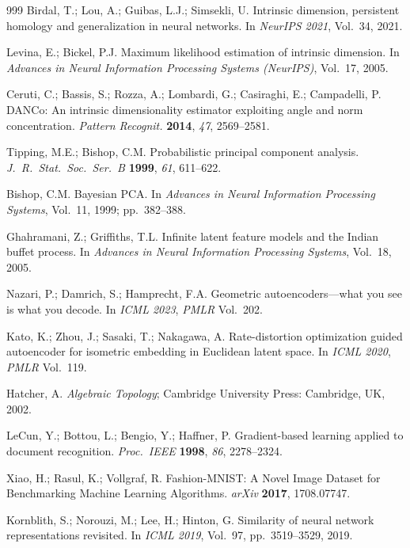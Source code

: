 \documentclass[make,article,submit,pdftex,moreauthors]{Definitions/mdpi}
\begin{document}
\begin{thebibliography}{999}
Birdal, T.; Lou, A.; Guibas, L.J.; Simsekli, U.
Intrinsic dimension, persistent homology and generalization in neural
networks.
In \textit{NeurIPS 2021}, Vol.~34, 2021.

Levina, E.; Bickel, P.J.
Maximum likelihood estimation of intrinsic dimension.
In \textit{Advances in Neural Information Processing Systems (NeurIPS)},
Vol.~17, 2005.

Ceruti, C.; Bassis, S.; Rozza, A.; Lombardi, G.; Casiraghi, E.;
Campadelli, P.
DANCo: An intrinsic dimensionality estimator exploiting angle and norm
concentration.
\textit{Pattern Recognit.} \textbf{2014}, \textit{47}, 2569--2581.

Tipping, M.E.; Bishop, C.M.
Probabilistic principal component analysis.
\textit{J.\ R.\ Stat.\ Soc.\ Ser.\ B} \textbf{1999}, \textit{61}, 611--622.

Bishop, C.M.
Bayesian PCA.
In \textit{Advances in Neural Information Processing Systems}, Vol.~11,
1999; pp.~382--388.

Ghahramani, Z.; Griffiths, T.L.
Infinite latent feature models and the Indian buffet process.
In \textit{Advances in Neural Information Processing Systems}, Vol.~18,
2005.

Nazari, P.; Damrich, S.; Hamprecht, F.A.
Geometric autoencoders---what you see is what you decode.
In \textit{ICML 2023}, \textit{PMLR} Vol.~202.

Kato, K.; Zhou, J.; Sasaki, T.; Nakagawa, A.
Rate-distortion optimization guided autoencoder for isometric embedding in
Euclidean latent space.
In \textit{ICML 2020}, \textit{PMLR} Vol.~119.

Hatcher, A.
\textit{Algebraic Topology};
Cambridge University Press: Cambridge, UK, 2002.

LeCun, Y.; Bottou, L.; Bengio, Y.; Haffner, P.
Gradient-based learning applied to document recognition.
\textit{Proc.\ IEEE} \textbf{1998}, \textit{86}, 2278--2324.

Xiao, H.; Rasul, K.; Vollgraf, R.
Fashion-{MNIST}: A Novel Image Dataset for Benchmarking Machine Learning
Algorithms.
\textit{arXiv} \textbf{2017}, 1708.07747.

Kornblith, S.; Norouzi, M.; Lee, H.; Hinton, G.
Similarity of neural network representations revisited.
In \textit{ICML 2019}, Vol.~97, pp.~3519--3529, 2019.


\end{thebibliography}
\end{document}

